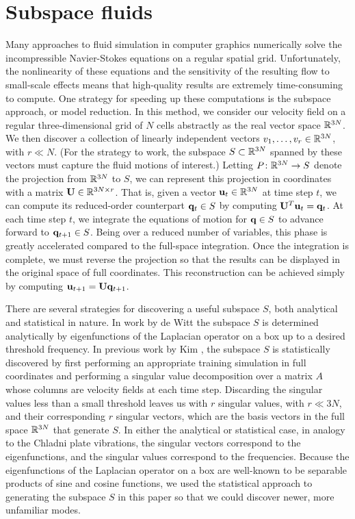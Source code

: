 \documentclass[11pt]{article}
\begin{document}
\section*{Subspace fluids}
Many approaches to fluid simulation in computer graphics numerically solve the incompressible Navier-Stokes equations on a regular spatial grid. Unfortunately, the nonlinearity of these equations and the sensitivity of the resulting flow to small-scale effects means that high-quality results are extremely time-consuming to compute. One strategy for speeding up these computations is the subspace approach, or model reduction. In this method, we consider our velocity field on a regular three-dimensional grid of $N$ cells abstractly as the real vector space $\mathbb{R}^{3N}$. We then discover a collection of linearly independent vectors $v_1, \ldots, v_r \in \mathbb{R}^{3N}$, with $r \ll N$. (For the strategy to work, the subspace $S \subset \mathbb{R}^{3N}$ spanned by these vectors must capture the fluid motions of interest.) Letting $P \colon \mathbb{R}^{3N} \rightarrow S$ denote the projection from $\mathbb{R}^{3N}$ to $S$, we can represent this projection in coordinates with a matrix $\mathbf{U} \in \mathbb{R}^{3N \times r}$. That is, given a vector $\mathbf{u}_t \in \mathbb{R}^{3N}$ at time step $t$, we can compute its reduced-order counterpart $\mathbf{q}_t \in S$ by computing $\mathbf{U}^T \mathbf{u}_t = \mathbf{q}_t$. At each time step $t$, we integrate the equations of motion for $\mathbf{q} \in S$ to advance forward to $\mathbf{q}_{t+1} \in S$. Being over a reduced number of variables, this phase is greatly accelerated compared to the full-space integration. Once the integration is complete, we must reverse the projection so that the results can be displayed in the original space of full coordinates. This reconstruction can be achieved simply by computing $\mathbf{u}_{t+1} = \mathbf{U}\mathbf{q}_{t+1}$.

There are several strategies for discovering a useful subspace $S$, both analytical and statistical in nature. In work by de Witt \cite{deWitt:2012} the subspace $S$ is determined analytically by eigenfunctions of the Laplacian operator on a box up to a desired threshold frequency. In previous work by Kim \cite{Kim2013}, the subspace $S$ is statistically discovered by first performing an appropriate training simulation in full coordinates and performing a singular value decomposition over a matrix $A$ whose columns are velocity fields at each time step. Discarding the singular values less than a small threshold leaves us with $r$ singular values, with $r \ll 3N$, and their corresponding $r$ singular vectors, which are the basis vectors in the full space $\mathbb{R}^{3N}$ that generate $S$. In either the analytical or statistical case, in analogy to the Chladni plate vibrations, the singular vectors correspond to the eigenfunctions, and the singular values correspond to the frequencies. Because the eigenfunctions of the Laplacian operator on a box are well-known to be separable products of sine and cosine functions, we used the statistical approach to generating the subspace $S$ in this paper so that we could discover newer, more unfamiliar modes.
    
\end{document}
